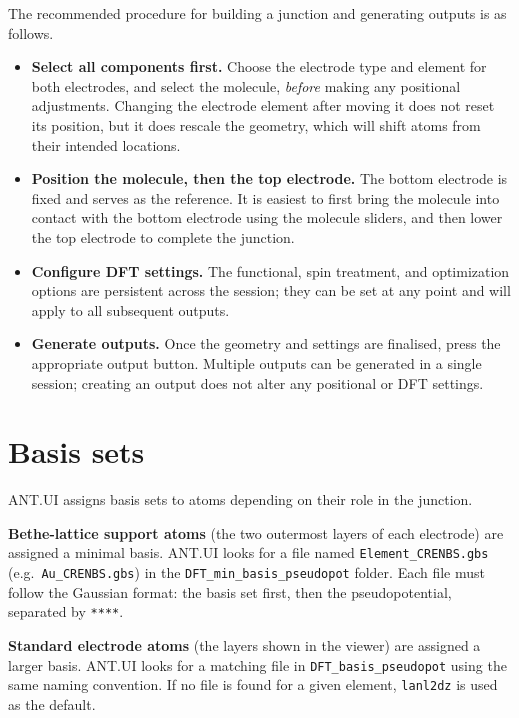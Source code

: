 \documentclass[12pt]{article}
\begin{document}
The recommended procedure for building a junction and generating outputs is as follows.

\begin{itemize}
    \item \textbf{Select all components first.} Choose the electrode type and element for both electrodes, and select the molecule, \emph{before} making any positional adjustments. Changing the electrode element after moving it does not reset its position, but it does rescale the geometry, which will shift atoms from their intended locations.

    \item \textbf{Position the molecule, then the top electrode.} The bottom electrode is fixed and serves as the reference. It is easiest to first bring the molecule into contact with the bottom electrode using the molecule sliders, and then lower the top electrode to complete the junction.

    \item \textbf{Configure DFT settings.} The functional, spin treatment, and optimization options are persistent across the session; they can be set at any point and will apply to all subsequent outputs.

    \item \textbf{Generate outputs.} Once the geometry and settings are finalised, press the appropriate output button. Multiple outputs can be generated in a single session; creating an output does not alter any positional or DFT settings.
\end{itemize}

\section{Basis sets}

ANT.UI assigns basis sets to atoms depending on their role in the junction.

\textbf{Bethe-lattice support atoms} (the two outermost layers of each electrode) are assigned a minimal basis. ANT.UI looks for a file named \texttt{Element\_CRENBS.gbs} (e.g.\ \texttt{Au\_CRENBS.gbs}) in the \texttt{DFT\_min\_basis\_pseudopot} folder. Each file must follow the Gaussian format: the basis set first, then the pseudopotential, separated by \texttt{****}.

\textbf{Standard electrode atoms} (the layers shown in the viewer) are assigned a larger basis. ANT.UI looks for a matching file in \texttt{DFT\_basis\_pseudopot} using the same naming convention. If no file is found for a given element, \texttt{lanl2dz} is used as the default.
\end{document}

